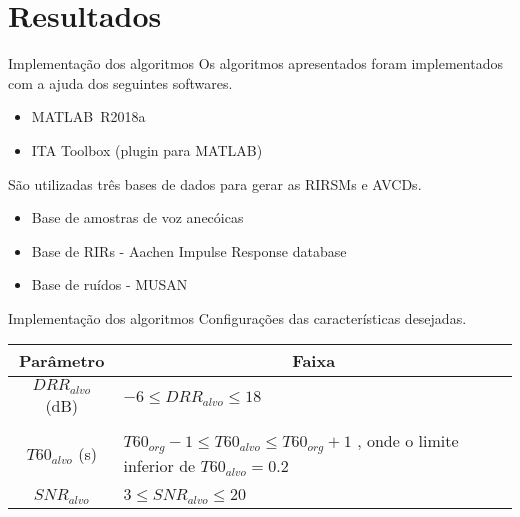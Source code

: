 \section{Resultados}


\begin{frame}{Implementação dos algoritmos}
    Os algoritmos apresentados foram implementados com a ajuda dos seguintes softwares.
    \vspace{0.5cm}
    
    \begin{itemize}
        \item MATLAB\textregistered \  R2018a
        \item ITA Toolbox (plugin para MATLAB) \cite{ITA_Toolbox}
    \end{itemize}
    \vspace{0.5cm}

    São utilizadas três bases de dados para gerar as RIRSMs e AVCDs.
    \vspace{0.5cm}

    \begin{itemize}
        \item Base de amostras de voz anecóicas
        \item Base de RIRs - Aachen Impulse Response database
        \item Base de ruídos - MUSAN
    \end{itemize}
\end{frame}

\begin{frame}{Implementação dos algoritmos}
    Configurações das características desejadas.
    \vspace{1cm}

    \begin{table} [H]
        \centering
        \begin{tabular}{c|p{7cm}}
    
            \multicolumn{1}{c|}{\textbf{Parâmetro}} & \multicolumn{1}{c}{\textbf{Faixa}} \\
            \hline 
    
            $DRR_{alvo}$ (dB) & $-6 \le DRR_{alvo} \le 18 $ \\
            & \\
            $T60_{alvo}$ (s) & $T60_{org} - 1  \le T60_{alvo} \le T60_{org} + 1$ , onde o limite inferior de $T60_{alvo} = 0.2$ \\
            & \\
            $SNR_{alvo}$ & $3 \le SNR_{alvo} \le 20 $ \\
    
        \end{tabular}
    \end{table}
\end{frame}

